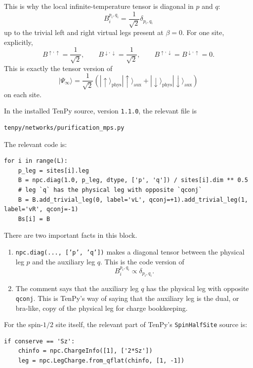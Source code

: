 \documentclass[11pt]{article}
\begin{document}
This is why the local infinite-temperature tensor is diagonal in \(p\) and \(q\):
\[
B_i^{p_i,q_i}
=
\frac{1}{\sqrt{2}}\delta_{p_i,q_i}
\]
up to the trivial left and right virtual legs present at \(\beta=0\).
For one site, explicitly,
\[
B^{\uparrow,\uparrow}=\frac{1}{\sqrt{2}},
\qquad
B^{\downarrow,\downarrow}=\frac{1}{\sqrt{2}},
\qquad
B^{\uparrow,\downarrow}=B^{\downarrow,\uparrow}=0.
\]
This is exactly the tensor version of
\[
|\Psi_\infty\rangle
=
\frac{1}{\sqrt{2}}
\left(
|\uparrow\rangle_{\mathrm{phys}}|\uparrow\rangle_{\mathrm{aux}}
+
|\downarrow\rangle_{\mathrm{phys}}|\downarrow\rangle_{\mathrm{aux}}
\right)
\]
on each site.

In the installed TenPy source, version \texttt{1.1.0}, the relevant file is

\begin{Verbatim}[fontsize=\small]
tenpy/networks/purification_mps.py
\end{Verbatim}

The relevant code is:

\begin{Verbatim}[fontsize=\small]
for i in range(L):
    p_leg = sites[i].leg
    B = npc.diag(1.0, p_leg, dtype, ['p', 'q']) / sites[i].dim ** 0.5
    # leg `q` has the physical leg with opposite `qconj`
    B = B.add_trivial_leg(0, label='vL', qconj=+1).add_trivial_leg(1, label='vR', qconj=-1)
    Bs[i] = B
\end{Verbatim}

There are two important facts in this block.

\begin{enumerate}[label=(\roman*)]
\item \texttt{npc.diag(..., ['p', 'q'])} makes a diagonal tensor between the
physical leg \(p\) and the auxiliary leg \(q\). This is the code version of
\[
B_i^{p_i,q_i}\propto\delta_{p_i,q_i}.
\]
\item The comment says that the auxiliary leg \(q\) has the physical leg with
opposite \texttt{qconj}. This is TenPy's way of saying that the auxiliary leg is
the dual, or bra-like, copy of the physical leg for charge bookkeeping.
\end{enumerate}

For the spin-\(1/2\) site itself, the relevant part of TenPy's
\texttt{SpinHalfSite} source is:

\begin{Verbatim}[fontsize=\small]
if conserve == 'Sz':
    chinfo = npc.ChargeInfo([1], ['2*Sz'])
    leg = npc.LegCharge.from_qflat(chinfo, [1, -1])
\end{Verbatim}
\end{document}
